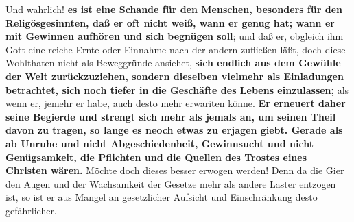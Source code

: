   Und wahrlich! \textbf{es ist eine
Schande für den Menschen, besonders für den
Religösgesinnten, daß er oft nicht weiß, wann er genug hat; wann er mit Gewinnen
aufhören und sich begnügen soll}; und daß er, obgleich ihm Gott eine reiche
Ernte
oder Einnahme nach der andern zufließen läßt, doch diese Wohlthaten nicht als
Beweggründe ansiehet, \label{ref:13_07_reichtum_genuegsamkeit}
\textbf{sich endlich aus dem Gewühle der Welt zurückzuziehen,
sondern dieselben vielmehr als Einladungen betrachtet, sich noch tiefer in die
Geschäfte des Lebens einzulassen;} als wenn er, jemehr er habe, auch desto mehr
erwariten könne. \textbf{Er erneuert daher seine Begierde und strengt sich mehr
als
jemals an, um seinen Theil davon zu tragen, so lange es neoch etwas zu erjagen
giebt. Gerade als ab Unruhe und nicht Abgeschiedenheit,
Gewinnsucht und nicht
Genügsamkeit, die Pflichten und die Quellen des
Trostes eines Christen wären.}
Möchte doch dieses besser erwogen werden! Denn da die Gier den Augen und der
Wachsamkeit der Gesetze mehr als andere Laster entzogen ist, so ist er aus
 Mangel an gesetzlicher Aufsicht und
Einschränkung desto gefährlicher.

\medskip

